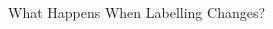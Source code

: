 \documentclass{beamer}
\begin{document}
\begin{frame}{What Happens When Labelling Changes?}
\begin{columns}
\begin{column}{0.5\textwidth}
    \end{column}
  \end{columns}
\end{frame}


\end{document}
